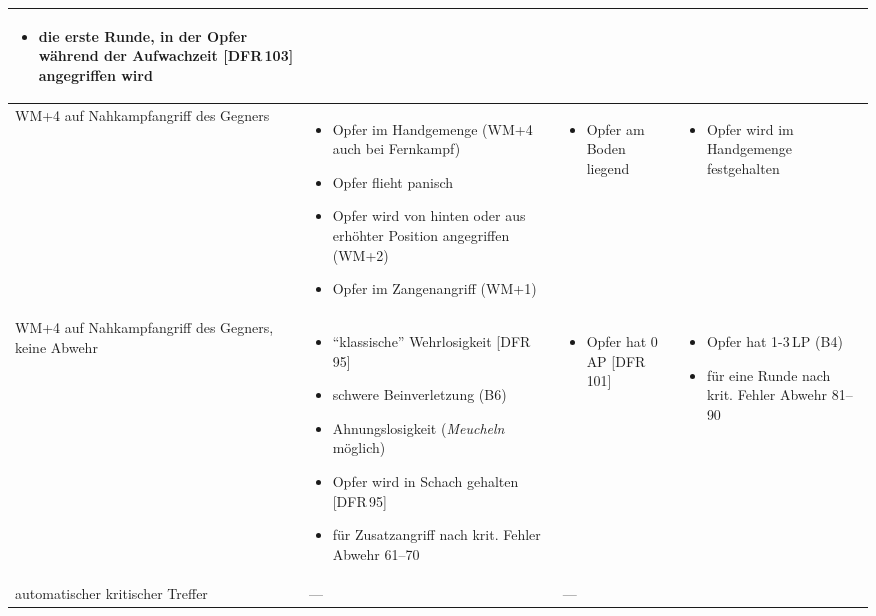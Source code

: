 \documentclass[10pt,a4paper,germanpar]{article}
\begin{document}
\begin{table}[htbp]
{\begin{center}
\begin{tabu}{|p{2.4cm}||p{4.3cm}|p{4.1cm}|p{4.5cm}|}
\begin{itemize}
      \item die erste Runde, in der Opfer während der Aufwachzeit
        [DFR\,103] angegriffen wird
      \end{itemize} \\
      \hline
      WM+4 auf Nahkampfangriff des Gegners &
      \begin{itemize}
      \item Opfer im Handgemenge (WM+4 auch bei Fernkampf)
      \item Opfer flieht panisch
      \item Opfer wird von hinten oder aus erhöhter Position
        angegriffen (WM+2)
      \item Opfer im Zangenangriff (WM+1)
      \end{itemize} &
      \begin{itemize}
      \item Opfer am Boden liegend
      \end{itemize} &
      \begin{itemize}
      \item Opfer wird im Handgemenge festgehalten
      \end{itemize}
      \\
      \hline
      WM+4 auf Nahkampfangriff des Gegners, keine Abwehr &
      \begin{itemize}
      \item "`klassische"' Wehrlosigkeit [DFR\,95]
      \item schwere Beinverletzung (B6)
      \item Ahnungslosigkeit (\emph{Meucheln} möglich)
      \item Opfer wird in Schach gehalten [DFR\,95]
      \item für Zusatzangriff nach krit. Fehler Abwehr 61--70
      \end{itemize}&
      \begin{itemize}
      \item Opfer hat 0\,AP [DFR\,101]
      \end{itemize}& 
      \begin{itemize}
      \item Opfer hat 1-3\,LP (B4)
      \item für eine Runde nach krit. Fehler Abwehr 81--90
      \end{itemize}\\
      \hline
      automatischer kritischer Treffer\footnotemark&
      ---&
      ---&
      \begin{itemize}

\end{itemize}
\end{tabu}
\end{center}}
\end{table}
\end{document}
